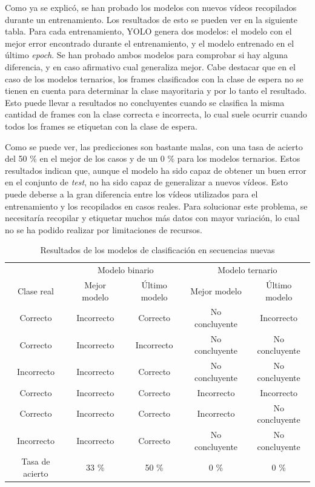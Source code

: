 \documentclass[12pt]{report} %
\begin{document}
    Como ya se explicó, se han probado los modelos con nuevos vídeos recopilados
    durante un entrenamiento. Los resultados de esto se pueden ver en la
    siguiente tabla. Para cada entrenamiento, YOLO genera dos modelos: el modelo
    con el mejor error encontrado durante el entrenamiento, y el modelo
    entrenado en el último \textit{epoch}. Se han probado ambos modelos para
    comprobar si hay alguna diferencia, y en caso afirmativo cual generaliza
    mejor. Cabe destacar que en el caso de los modelos ternarios, los frames
    clasificados con la clase de espera no se tienen en cuenta para determinar
    la clase mayoritaria y por lo tanto el resultado. Esto puede llevar a
    resultados no concluyentes cuando se clasifica la misma cantidad de frames
    con la clase correcta e incorrecta, lo cual suele ocurrir cuando todos los
    frames se etiquetan con la clase de espera.

    Como se puede ver, las predicciones son bastante malas, con una tasa de
    acierto del 50 \% en el mejor de los casos y de un 0 \% para los modelos
    ternarios. Estos resultados indican que, aunque el modelo ha sido capaz de
    obtener un buen error en el conjunto de \textit{test}, no ha sido capaz de
    generalizar a nuevos vídeos. Esto puede deberse a la gran diferencia entre
    los vídeos utilizados para el entrenamiento y los recopilados en casos
    reales. Para solucionar este problema, se necesitaría recopilar y etiquetar
    muchos más datos con mayor variación, lo cual no se ha podido realizar por
    limitaciones de recursos.

    \begin{table}[H]
        \center
        \begin{tabular}{@{}ccccc@{}}
            \toprule
             & \multicolumn{2}{c}{Modelo binario} & \multicolumn{2}{c}{Modelo ternario} \\
            \cmidrule(lr){2-3} \cmidrule(l){4-5}
            Clase real & Mejor modelo & Último modelo & Mejor modelo & Último modelo \\
            \midrule
            Correcto   & Incorrecto & Correcto   & No concluyente & Incorrecto \\
            Correcto   & Incorrecto & Incorrecto & No concluyente & No concluyente \\
            Incorrecto & Incorrecto & Correcto   & No concluyente & No concluyente \\
            Correcto   & Incorrecto & Correcto   & Incorrecto     & Incorrecto \\
            Correcto   & Incorrecto & Correcto   & Incorrecto     & No concluyente \\
            Incorrecto & Incorrecto & Correcto   & No concluyente & No concluyente \\
            \midrule
            Tasa de acierto & 33 \% & 50 \% & 0 \% & 0 \% \\
            \bottomrule
        \end{tabular}
        \caption{Resultados de los modelos de clasificación en secuencias nuevas}
    \end{table}
\end{document}
